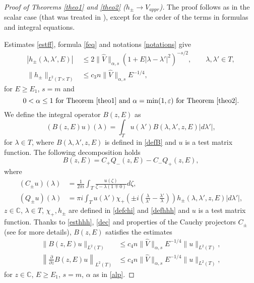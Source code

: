 \documentclass[11pt,a4paper,english,subeqn]{amsart}
\theoremstyle{plain}
\theoremstyle{definition}
\numberwithin{equation}{section}
\begin{document}
\begin{proof}[Proof of Theorems \ref{theo1} and \ref{theo2} ($h_{\pm} \longrightarrow V_{appr}$)]
The proof follows as in the scalar case (that was treated in \cite{N4}), except for the order of the terms in formulas and integral equations.\smallskip

Estimates \eqref{estff}, formula \eqref{feq} and notations \eqref{notations} give
\begin{subequations} \label{esthhh}
\begin{align}
|h_{\pm}(\lambda, \lambda', E)| &\leq 2 \| \widehat{V}\|_{\alpha,s} ( 1 + E |\lambda-\lambda'|^2)^{-s/2},\qquad \lambda, \lambda' \in T,\\ \label{esth}
\|h_{\pm}\|_{L^2(T \times T)}&\leq c_3 n \| \widehat{V}\|_{\alpha,s} E^{-1/4},
\end{align}
\end{subequations}
for $E \geq E_1$, $s=m$ and
\begin{equation} \label{alp}
0 < \alpha \leq 1 \text{ for Theorem \ref{theo1} and } \alpha = \min(1,\varepsilon) \text{ for Theorem \ref{theo2}}.
\end{equation}
We define the integral operator $B(z,E)$ as
\begin{equation}
(B(z,E)u)(\lambda) = \int_T  u(\lambda') B(\lambda, \lambda',z,E) |d\lambda'|,
\end{equation}
for $\lambda \in T$, where $B(\lambda,\lambda',z,E)$ is defined in \eqref{defB} and $u$ is a test matrix function. The following decomposition holds
\begin{equation} \label{dec}
B(z,E) = C_+ Q_-(z,E) - C_- Q_+ (z,E),
\end{equation}
where
\begin{align}
(C_{\pm}u)(\lambda) &= \frac{1}{2 \pi i} \int_T \frac{u(\zeta)}{\zeta - \lambda( 1 \mp 0) } d \zeta, \\
(Q_{\pm} u )(\lambda) &= \pi i \int_T u (\lambda') \chi_+ \left( \pm i \left( \frac{\lambda}{\lambda'} - \frac{\lambda'}{\lambda} \right) \right) h_{\pm}(\lambda, \lambda',z, E) |d \lambda'|,
\end{align}
$z \in {\mathbb{C}}$, $\lambda \in T$, $\chi_+, h_{\pm}$ are defined in \eqref{defchi} and \eqref{defhhh} and $u$ is a test matrix function. Thanks to \eqref{esthhh}, \eqref{dec} and properties of the Cauchy projectors $C_{\pm}$ (see \cite{N4} for more details), $B(z,E)$ satisfies the estimates
\begin{subequations}  \label{estB}
\begin{align} \label{estBa}
\| B(z,E)u\|_{L^2(T)} &\leq c_4 n \| \widehat{V}\|_{\alpha,s} E^{-1/4} \|u\|_{L^2(T)}, \\
\left\| \frac{\partial}{\partial z}B(z,E)u \right\|_{L^2(T)} &\leq c_4 n  \| \widehat{V}\|_{\alpha,s} E^{-1/4} \|u\|_{L^2(T)},
\end{align}
\end{subequations}
for $z \in {\mathbb{C}}$, $E \geq E_1$, $s=m$, $\alpha$ as in \eqref{alp}.\smallskip 


\end{proof}
\end{document}
